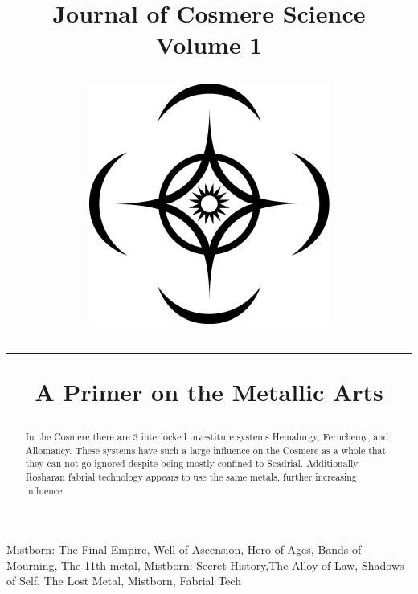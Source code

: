 \documentclass[conference]{IEEEtran}
\newcommand{\n}{\hfill\break}
\begin{document}
\makeatletter
\newlength{\logoheight}
\setlength{\logoheight}{50pt} %

    

\title{\parbox[c]{.75\linewidth}{{\selectfont\Huge{\textbf{Journal of Cosmere Science}}\\\huge{Volume 1}}}%
    \hfill%
    \raisebox{\dimexpr-.5\logoheight+.5ex\relax}%
    {\includegraphics[height=\logoheight]{images/cosmere_symbol.png}}\par%
    \vspace{15pt}%
    
    \hrule
    \n
    \textbf{A Primer on the Metallic Arts}}

\author{
}

\maketitle

\begin{abstract}
In the Cosmere there are 3 interlocked investiture systems Hemalurgy, Feruchemy, and Allomancy.  These systems have such a large influence on the Cosmere as a whole that they can not go ignored despite being mostly confined to Scadrial.  Additionally Rosharan fabrial technology appears to use the same metals, further increasing influence.
\end{abstract}

\begin{IEEEkeywords}
 Mistborn: The Final Empire, Well of Ascension, Hero of Ages, Bands of Mourning, The 11th metal, Mistborn: Secret History,The Alloy of Law, Shadows of Self, The Lost Metal, Mistborn, Fabrial Tech
\end{IEEEkeywords}
\n
\end{document}
